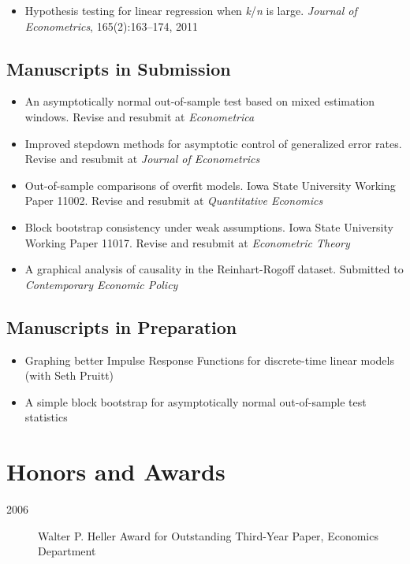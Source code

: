 \documentclass[12pt]{article}%
\newcommand{\allcaps}[1]{\textls{\MakeUppercase{#1}}}
\begin{document}
\begin{itemize}
\item Hypothesis testing for linear regression when
\textit{k}/\textit{n} is large. \textit{Journal of Econometrics},
165(2):163--174, 2011
\end{itemize}

\subsection*{Manuscripts in Submission}

\begin{itemize}
\item An asymptotically normal out-of-sample test based on mixed
  estimation windows. Revise and resubmit at \textit{Econometrica}
\item Improved stepdown methods for asymptotic control of generalized
  error rates. Revise and resubmit at \textit{Journal of Econometrics}
\item Out-of-sample comparisons of overfit models. Iowa State
  University Working Paper 11002. Revise and resubmit at
  \textit{Quantitative Economics}
\item Block bootstrap consistency under weak assumptions. Iowa State
  University Working Paper 11017. Revise and resubmit at
  \textit{Econometric Theory}
\item A graphical analysis of causality in the Reinhart-Rogoff
  dataset. Submitted to \textit{Contemporary Economic Policy}
\end{itemize}
  
\subsection*{Manuscripts in Preparation}
\begin{itemize}
\item Graphing better Impulse Response Functions for discrete-time
  linear models (with Seth Pruitt)
\item A simple block bootstrap for asymptotically normal out-of-sample
  test statistics
\end{itemize}

\section*{Honors and Awards}

\begin{description}
\item[2006] Walter P. Heller Award for Outstanding Third-Year Paper,
\allcaps{UCSD} Economics Department
\end{description}
\end{document}
